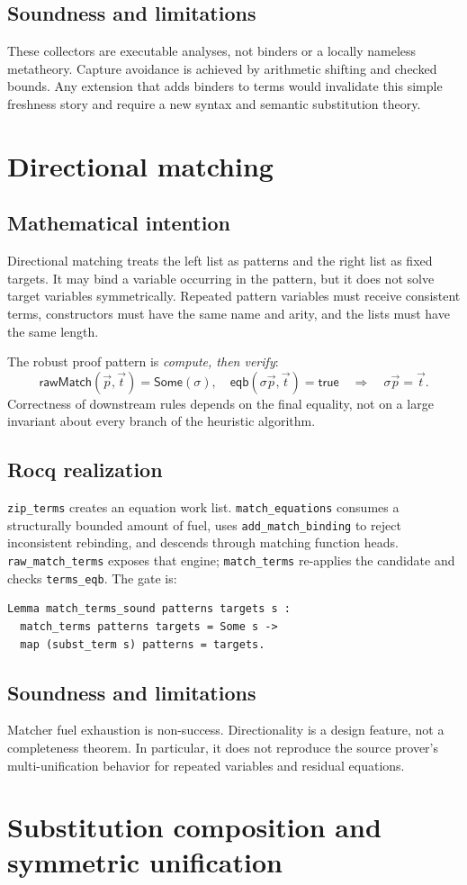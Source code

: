 \documentclass[11pt,oneside]{book}
\DeclareRobustCommand{\code}[1]{\nolinkurl{#1}}
\newcommand{\mathintent}{\subsection*{Mathematical intention}}
\newcommand{\rocqreal}{\subsection*{Rocq realization}}
\newcommand{\soundlim}{\subsection*{Soundness and limitations}}
\begin{document}
\soundlim

These collectors are executable analyses, not binders or a locally nameless
metatheory.  Capture avoidance is achieved by arithmetic shifting and checked
bounds.  Any extension that adds binders to terms would invalidate this simple
freshness story and require a new syntax and semantic substitution theory.

\section{Directional matching}

\mathintent

Directional matching treats the left list as patterns and the right list as
fixed targets.  It may bind a variable occurring in the pattern, but it does
not solve target variables symmetrically.  Repeated pattern variables must
receive consistent terms, constructors must have the same name and arity, and
the lists must have the same length.

The robust proof pattern is \emph{compute, then verify}:
\[
 \mathsf{rawMatch}(\vec p,\vec t)=\mathsf{Some}(\sigma),
 \quad
 \mathsf{eqb}(\sigma\vec p,\vec t)=\mathsf{true}
 \quad\Longrightarrow\quad
 \sigma\vec p=\vec t.
\]
Correctness of downstream rules depends on the final equality, not on a large
invariant about every branch of the heuristic algorithm.

\rocqreal

\code{zip_terms} creates an equation work list.  \code{match_equations} consumes
a structurally bounded amount of fuel, uses \code{add_match_binding} to reject
inconsistent rebinding, and descends through matching function heads.
\code{raw_match_terms} exposes that engine; \code{match_terms} re-applies the
candidate and checks \code{terms_eqb}.  The gate is:
\begin{lstlisting}[caption={The small theorem consumed by matched unfolding.}]
Lemma match_terms_sound patterns targets s :
  match_terms patterns targets = Some s ->
  map (subst_term s) patterns = targets.
\end{lstlisting}

\soundlim

Matcher fuel exhaustion is non-success.  Directionality is a design feature,
not a completeness theorem.  In particular, it does not reproduce the source
prover's multi-unification behavior for repeated variables and residual
equations.

\section{Substitution composition and symmetric unification}
\end{document}
